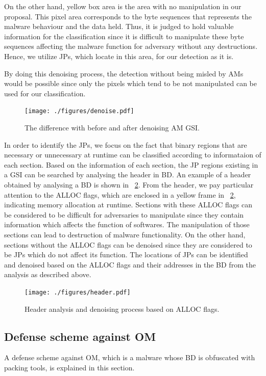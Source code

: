 \documentclass{ieeeaccess}
\begin{document}
On the other hand, yellow box area is the area with no manipulation in our proposal.
This pixel area corresponds to the byte sequences that represents the malware behaviour and the data held.
Thus, it is judged to hold valuable information for the classification since it is difficult to manipulate these byte sequences affecting the malware function for adversary without any destructions.
Hence, we utilize JPs, which locate in this area, for our detection as it is.

By doing this denoising process, the detection without being misled by AMs would be possible since only the pixels which tend to be not manipulated can be used for our classification.

\begin{figure}[t]
 \centering
 \texttt{[image: ./figures/denoise.pdf]}
 \caption{The difference with before and after denoising AM GSI.} 
 \label{fig:denoise}
\end{figure}

In order to identify the JPs, we focus on the fact that binary regions that are necessary or unnecessary at runtime can be classified according to informataion of each section.
Based on the information of each section, the JP regions existing in a GSI can be searched by analysing the header in BD.
An example of a header obtained by analysing a BD is shown in \figurename~\ref{fig:header}.
From the header, we pay particular attention to the ALLOC flags, which are enclosed in a yellow frame in \figurename~\ref{fig:header}, indicating memory allocation at runtime.
Sections with these ALLOC flags can be considered to be difficult for adversaries to manipulate since they contain information which affects the function of softwares.
The manipulation of those sections can lead to destruction of malware functionality. 
On the other hand, sections without the ALLOC flags can be denoised since they are considered to be JPs which do not affect its function.
The locations of JPs can be identified and denoised based on the ALLOC flags and their addresses in the BD from the analysis as described above.
\begin{figure}[t]
 \centering
 \texttt{[image: ./figures/header.pdf]}
	\caption{Header analysis and denoising process based on ALLOC flags.} 
 \label{fig:header}
\end{figure}

\subsection{Defense scheme against OM}
A defense scheme against OM, which is a malware whose BD is obfuscated with packing tools, is explained in this section.
\end{document}

